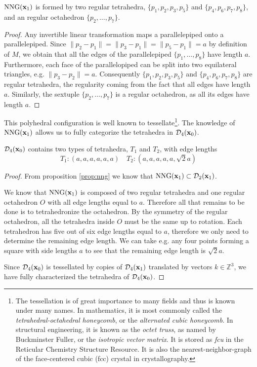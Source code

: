 \begin{lemma}
	$\mathrm{NNG}({\mathbf{x}}_1)$ is formed by two regular tetrahedra, $\{p_1,p_2,p_3,p_5\}$ and $\{p_4,p_6,p_7,p_8\}$, and an regular octahedron $\{p_2,\dots,p_7\}$.
\end{lemma}
\begin{proof}
	Any invertible linear transformation maps a parallelepiped onto a parallelepiped. Since $\|p_2 - p_1\| = \|p_3-p_1\| = \|p_5-p_1\|=a$ by definition of $M$, we obtain that all the edges of the parallelepiped $\{p_1,\dots,p_8\}$ have length $a$. Furthermore, each face of the parallelopiped can be split into two equilateral triangles, e.g. $\|p_3-p_2\|=a$. Consequently $\{p_1,p_2,p_3,p_5\}$ and $\{p_4,p_6,p_7,p_8\}$ are regular tetrahedra, the regularity coming from the fact that all edges have length $a$. Similarly, the sextuple $\{p_2,\dots,p_7\}$ is a regular octahedron, as all its edges have length $a$.
\end{proof}

This polyhedral configuration is well known to tessellate\footnote{ The tessellation is of great importance to many fields and thus is known under many names. In mathematics, it is most commonly called the \textit{tetrahedral-octahedral honeycomb}, or the \textit{alternated cubic honeycomb}. In structural engineering, it is known as the \textit{octet truss}, as named by Buckminster Fuller, or the \textit{isotropic vector matrix}. It is stored as \textit{fcu} in the Reticular Chemistry Structure Resource\cite{RCSR}. It is also the nearest-neighbor-graph of the face-centered cubic (fcc) crystal in crystallography\cite{Gabbrielli12}.  }. The knowledge of $\mathrm{NNG}({\mathbf{x}}_1)$ allows us to fully categorize the tetrahedra in $\mathcal D_4({\mathbf{x}}_0)$.

\begin{proposition}\label{prop:tetraInTess} $\mathcal D_4({\mathbf{x}}_0)$ contains two types of tetrahedra, $T_1$ and $T_2$, with edge lengths
$$T_1: (a,a,a,a,a,a) \quad T_2:(a,a,a,a,a,\sqrt 2a)$$
\end{proposition}
\begin{proof}
From proposition \ref{prop:nng} we know that $\mathrm{NNG}({\mathbf{x}}_1) \subset \mathcal D_2({\mathbf{x}}_1)$. 

We know that $\text{NNG}({\mathbf{x}}_1)$ is composed of two regular tetrahedra and one regular octahedron $O$ with all edge lengths equal to $a$. Therefore all that remains to be done is to tetrahedronize the octahedron. By the symmetry of the regular octahedron, all the tetrahedra inside $O$ must be the same up to rotation. Each tetrahedron has five out of six edge lengths equal to $a$, therefore we only need to determine the remaining edge length. We can take e.g. any four points forming a square with side lengths $a$ to see that the remaining edge length is $\sqrt 2a$.

Since $\mathcal D_4({\mathbf{x}}_0)$ is tessellated by copies of $\mathcal D_4({\mathbf{x}}_1)$ translated by vectors $k\in\mathbb Z^3$, we have fully characterized the tetrahedra of $\mathcal D_4({\mathbf{x}}_0)$. 
\end{proof}

